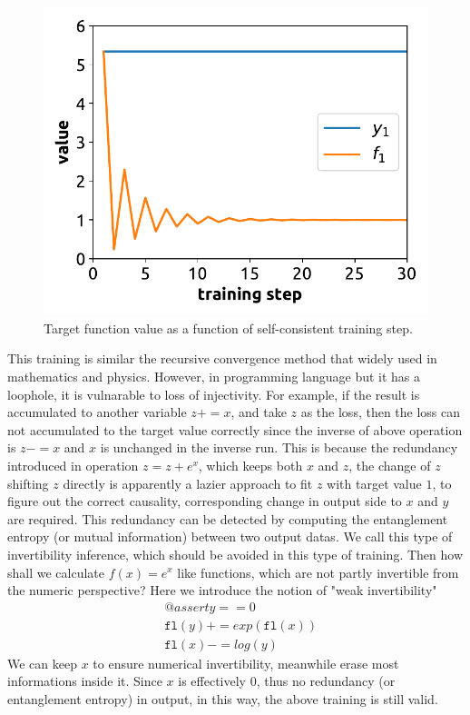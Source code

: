 \documentclass[aps,twocolumn,longbibliography,english,superscriptaddress,prr]{revtex4-1}
\newcommand{\<}{\langle}
\renewcommand{\>}{\rangle}
\newcommand{\fl}{\texttt{fl}}
\theoremstyle{definition}\newtheorem{definition}{\textit{Definition}}
\begin{document}
\begin{figure}
    \centerline{\includegraphics[width=\columnwidth,trim={0 0 0 0},clip]{images/fig1.pdf}}
    \caption{Target function value as a function of self-consistent training step.}\label{fig:invtrain}
\end{figure}

This training is similar the recursive convergence method that widely used in mathematics and physics.
However, in programming language but it has a loophole, it is vulnarable to loss of injectivity.
For example, if the result is accumulated to another variable $z += x$, and take $z$ as the loss, then the loss can not accumulated to the target value correctly since the inverse of above operation is $z -= x$ and $x$ is unchanged in the inverse run.
This is because the redundancy introduced in operation $z = z+e^x$, which keeps both $x$ and $z$, the change of $z$ shifting $z$ directly is apparently a lazier approach to fit $z$ with target value $1$, to figure out the correct causality, corresponding change in output side to $x$ and $y$ are required. This redundancy can be detected by computing the entanglement entropy (or mutual information) between two output datas. We call this type of invertibility inference, which should be avoided in this type of training. Then how shall we calculate $f(x) = e^x$ like functions, which are not partly invertible from the numeric perspective? Here we introduce the notion of "weak invertibility"
\begin{align}
    &@assert y == 0\\
    &\fl(y) += exp(\fl(x))\\
    &\fl(x) -= log(y)
\end{align}
We can keep $x$ to ensure numerical invertibility, meanwhile erase most informations inside it. Since $x$ is effectively $0$, thus no redundancy (or entanglement entropy) in output, in this way, the above training is still valid.
\end{document}
